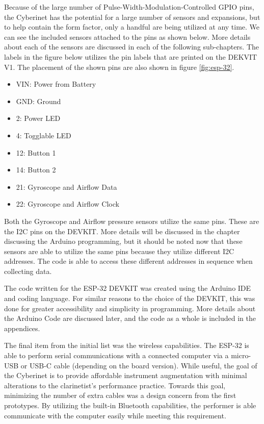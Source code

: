 

Because of the large number of Pulse-Width-Modulation-Controlled GPIO pins, the Cyberinet has the potential for a large number of sensors and expansions, but to help contain the form factor, only a handful are being utilized at any time. We can see the included sensors attached to the pins as shown below. More details about each of the sensors are discussed in each of the following sub-chapters. The labels in the figure below utilizes the pin labels that are printed on the DEKVIT V1. The placement of the shown pins are also shown in figure \ref{fig:esp-32}.

\begin{itemize}
    \item VIN: Power from Battery
    \item GND: Ground
    \item 2: Power LED
    \item 4: Togglable LED
    \item 12: Button 1
    \item 14: Button 2
    \item 21: Gyroscope and Airflow Data
    \item 22: Gyroscope and Airflow Clock
\end{itemize}

Both the Gyroscope and Airflow pressure sensors utilize the same pins. These are the I2C pins on the DEVKIT. More details will be discussed in the chapter discussing the Arduino programming, but it should be noted now that these sensors are able to utilize the same pins because they utilize different I2C addresses. The code is able to access these different addresses in sequence when collecting data.

The code written for the ESP-32 DEVKIT was created using the Arduino IDE and coding language. For similar reasons to the choice of the DEVKIT, this was done for greater accessibility and simplicity in programming. More details about the Arduino Code are discussed later, and the code as a whole is included in the appendices.

The final item from the initial list was the wireless capabilities. The ESP-32 is able to perform serial communications with a connected computer via a micro-USB or USB-C cable (depending on the board version). While useful, the goal of the Cyberinet is to provide affordable instrument augmentation with minimal alterations to the clarinetist's performance practice. Towards this goal, minimizing the number of extra cables was a design concern from the first prototypes. By utilizing the built-in Bluetooth capabilities, the performer is able communicate with the computer easily while meeting this requirement.

